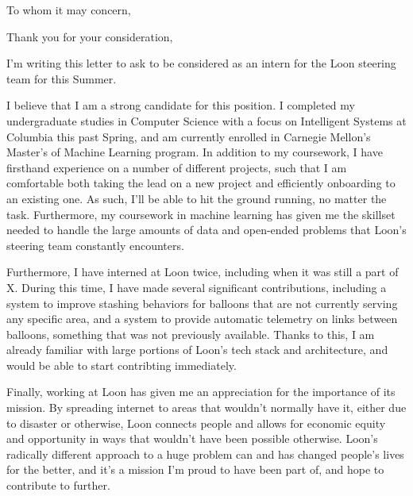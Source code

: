 \documentclass[11pt,a4paper,sans]{moderncv}        %
\begin{document}
\date{November 26, 2019}
\opening{To whom it may concern,}
\closing{Thank you for your consideration,}
\makelettertitle
I'm writing this letter to ask to be considered as an intern for the Loon steering team for this Summer.

I believe that I am a strong candidate for this position. I completed my undergraduate studies in
Computer Science with a focus on Intelligent Systems at Columbia this past Spring, and am
currently enrolled in Carnegie Mellon's Master's of Machine Learning program. In addition to
my coursework, I have firsthand experience on a number of different projects, such that I
am comfortable both taking the lead on a new project and efficiently onboarding to an existing
one. As such, I'll be able to hit the ground running, no matter the task. Furthermore, my coursework
in machine learning has given me the skillset needed to handle the large amounts of data and open-ended
problems that Loon's steering team constantly encounters.

Furthermore, I have interned at Loon twice, including when it was still a part of X. During this time,
I have made several significant contributions, including a system to improve stashing behaviors for
balloons that are not currently serving any specific area, and a system to provide automatic telemetry on
links between balloons, something that was not previously available. Thanks to this, I am already familiar
with large portions of Loon's tech stack and architecture, and would be able to start contribting immediately.

Finally, working at Loon has given me an appreciation for the importance of its mission. By spreading internet
to areas that wouldn't normally have it, either due to disaster or otherwise, Loon connects people and
allows for economic equity and opportunity in ways that wouldn't have been possible otherwise. Loon's radically
different approach to a huge problem can and has changed people's lives for the better, and it's a mission I'm
proud to have been part of, and hope to contribute to further.

\makeletterclosing
\end{document}

